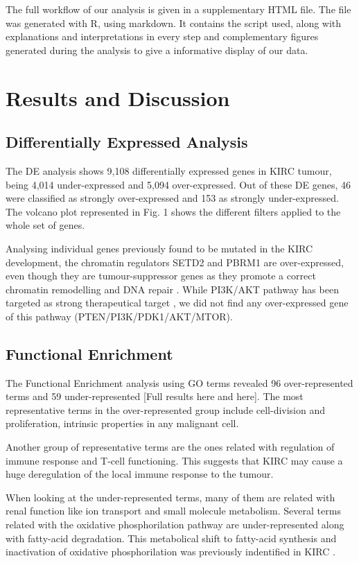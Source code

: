 \documentclass[9pt,twocolumn,twoside]{gsajnl}
\begin{document}
The full workflow of our analysis is given in a supplementary HTML file. The file was generated with R, using markdown. It contains the script used, along with explanations and interpretations in every step and complementary figures generated during the analysis to give a informative display of our data.  


\section*{Results and Discussion}
\subsection*{Differentially Expressed Analysis}
The DE analysis shows 9,108 differentially expressed genes in KIRC tumour, being 4,014 under-expressed and 5,094 over-expressed. Out of these DE genes, 46 were classified as strongly over-expressed and 153 as strongly under-expressed. The volcano plot represented in Fig. 1 shows the different filters applied to the whole set of genes.

Analysing individual genes previously found to be mutated in the KIRC development, the chromatin regulators SETD2 and PBRM1 are over-expressed, even though they are tumour-suppressor genes as they promote a correct chromatin remodelling and DNA repair \citep{Creighton2013, Kanu2015}. While PI3K/AKT pathway has been targeted as strong therapeutical target \citep{Creighton2013}, we did not find any over-expressed gene of this pathway (PTEN/PI3K/PDK1/AKT/MTOR).

\subsection*{Functional Enrichment}
The Functional Enrichment analysis using GO terms revealed 96 over-represented terms and 59 under-represented [Full results here and here]. The most representative terms in the over-represented group include cell-division and proliferation, intrinsic properties in any malignant cell. 

Another group of representative terms are the ones related with regulation of immune response and T-cell functioning. This suggests that KIRC may cause a huge deregulation of the local immune response to the tumour. 

When looking at the under-represented terms, many of them are related with renal function like ion transport and small molecule metabolism. Several terms related with the oxidative phosphorilation pathway are under-represented along with fatty-acid degradation. This metabolical shift to fatty-acid synthesis and inactivation of oxidative phosphorilation was previously indentified in KIRC \citep{Creighton2013}.
\end{document}
